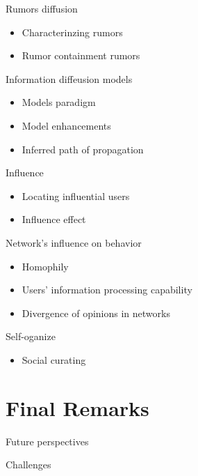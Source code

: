 \documentclass[8pt]{beamer}
\begin{document}
  \begin{frame}{Rumors diffusion}
    \begin{itemize}
      \item Characterinzing rumors
      \item Rumor containment rumors
    \end{itemize}
  \end{frame}

  \begin{frame}{Information diffeusion models}
    \begin{itemize}
      \item Models paradigm
      \item Model enhancements
      \item Inferred path of propagation
    \end{itemize}
  \end{frame}

  \begin{frame}{Influence}
    \begin{itemize}
      \item Locating influential users
      \item Influence effect
    \end{itemize}
  \end{frame}

  \begin{frame}{Network's influence on behavior}
    \begin{itemize}
      \item Homophily
      \item Users' information processing capability
      \item Divergence of opinions in networks
    \end{itemize}
  \end{frame}

  \begin{frame}{Self-oganize}

    \begin{itemize}
      \item Social curating
    \end{itemize}
  \end{frame}

  \section{Final Remarks}
  \begin{frame}{Future perspectives}
  \end{frame}
  \begin{frame}{Challenges}
  \end{frame}
\end{document}
